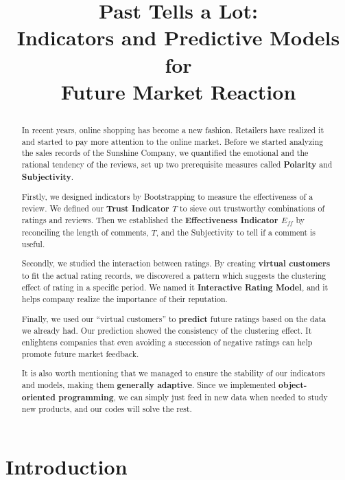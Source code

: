 \documentclass[12pt]{article}  %
\title{
  \begin{flushleft}
    \huge
    Past Tells a Lot:\\ \hspace{1.95cm} Indicators and Predictive Models for\\
  \hspace{6.5cm} Future Market Reaction 
  \end{flushleft}
}  %
\begin{document}
\begin{abstract}
  In recent years, online shopping has become a new fashion. Retailers have realized it and started to pay more attention to the online market.
  Before we started analyzing the sales records of the Sunshine Company, we quantified the emotional and the rational tendency of the reviews, set up two prerequisite measures called \textbf{Polarity} and \textbf{Subjectivity}.
  
  Firstly, we designed indicators by Bootstrapping to measure the effectiveness of a review. We defined our \textbf{Trust Indicator $T$} to sieve out trustworthy combinations of ratings and reviews. Then we established the\textbf{ Effectiveness Indicator $E_{ff}$} by reconciling the length of comments, $T$, and the Subjectivity to tell if a comment is useful.
  
  Secondly, we studied the interaction between ratings. By creating \textbf{virtual customers} to fit the actual rating records, we discovered a pattern which suggests the clustering effect of rating in a specific period. We named it \textbf{Interactive Rating Model}, and it helps company realize the importance of their reputation.
  
  Finally, we used our “virtual customers” to \textbf{predict} future ratings based on the data we already had. Our prediction showed the consistency of the clustering effect. It enlightens companies that even avoiding a succession of negative ratings can help promote future market feedback.
  
It is also worth mentioning that we managed to ensure the stability of our indicators and models, making them \textbf{generally adaptive}. Since we implemented \textbf{object-oriented programming}, we can simply just feed in new data when needed to study new products, and our codes will solve the rest.


\end{abstract}

\maketitle  %
\tableofcontents  %


\section{Introduction}
\end{document}
